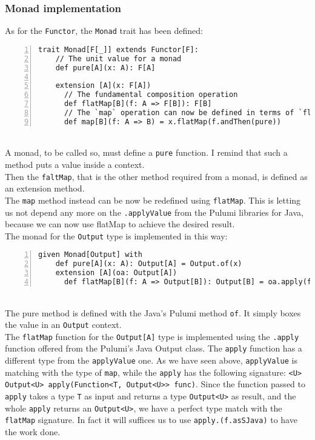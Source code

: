 \subsubsection{Monad implementation}
As for the \texttt{Functor}, the \texttt{Monad} trait has been defined:
\begin{lstlisting}[numbers=left, numberstyle=\tiny, numbersep=-5pt, stepnumber=1, linewidth=420pt]
  trait Monad[F[_]] extends Functor[F]:
    // The unit value for a monad
    def pure[A](x: A): F[A]

    extension [A](x: F[A])
      // The fundamental composition operation
      def flatMap[B](f: A => F[B]): F[B]
      // The `map` operation can now be defined in terms of `flatMap`
      def map[B](f: A => B) = x.flatMap(f.andThen(pure))
\end{lstlisting}\mbox{}\\
A monad, to be called so, must define a \texttt{pure} function.
I remind that such a method puts a value inside a context.\\
Then the \texttt{faltMap}, that is the other method required from a monad, is defined as an extension method.\\
The \texttt{map} method instead can be now be redefined using \texttt{flatMap}.
This is letting us not depend any more on the \texttt{.applyValue} from the Pulumi libraries for Java, because we can now use flatMap to achieve the desired result.\\
The monad for the \texttt{Output} type is implemented in this way:
\begin{lstlisting}[numbers=left, numberstyle=\tiny, numbersep=-5pt, stepnumber=1, linewidth=420pt]
  given Monad[Output] with
    def pure[A](x: A): Output[A] = Output.of(x)
    extension [A](oa: Output[A])
      def flatMap[B](f: A => Output[B]): Output[B] = oa.apply(f.asJava)
\end{lstlisting}\mbox{}\\
The pure method is defined with the Java's Pulumi method \texttt{of}.
It simply boxes the value in an \texttt{Output} context.\\
The \texttt{flatMap} function for the \texttt{Output[A]} type is implemented using the \texttt{.apply} function offered from the Pulumi's Java Output class.
The \texttt{apply} function has a different type from the \texttt{applyValue} one.
As we have seen above, \texttt{applyValue} is matching with the type of \texttt{map}, while the \texttt{apply} has the following signature: \texttt{<U> Output<U> apply(Function<T, Output<U>> func)}.
Since the function passed to \texttt{apply} takes a type \texttt{T} as input and returns a type \texttt{Output<U>} as result, and the whole \texttt{apply} returns an \texttt{Output<U>}, we have a perfect type match with the \texttt{flatMap} signature.
In fact it will suffices us to use \texttt{apply.(f.asSJava)} to have the work done.

